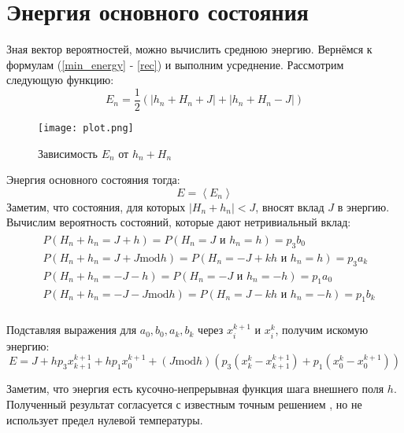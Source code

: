 \section{Энергия основного состояния}
Зная вектор вероятностей, можно вычислить среднюю энергию. Вернёмся к формулам (\ref{min_energy} - \ref{rec}) и выполним усреднение. Рассмотрим следующую функцию:
\begin{equation}
  E_n = \frac 1 2 (|h_n + H_n + J| + |h_n + H_n - J|)
\end{equation}

\begin{figure}
\centering
\texttt{[image: plot.png]}
\caption{Зависимость $E_n$ от $h_n+H_n$}
\end{figure}

Энергия основного состояния тогда:
\begin{equation}
  E = \left< E_n \right>
\end{equation}
Заметим, что состояния, для которых $|H_n + h_n| < J$, вносят вклад $J$ в энергию. Вычислим вероятность состояний, которые дают нетривиальный вклад:
\begin{align}
	\begin{split}
   &P(H_n + h_n = J+h) = P(H_n=J \text{ и } h_n = h) = p_3 b_0\\
   &P(H_n + h_n = J + J \text{mod} h) = P(H_n=-J+kh \text { и } h_n =h)=p_3 a_k\\
   &P(H_n + h_n = -J-h) = P(H_n=-J \text{ и } h_n = -h) = p_1 a_0\\
   &P(H_n + h_n =- J - J \text{mod} h) = P(H_n=J-kh \text{ и } h_n =-h)=p_1 b_k\\
   \end{split}
\end{align}

Подставляя выражения для $a_0, b_0, a_k, b_k$ через $x^{k+1}_i$ и $x^{k}_i$, получим искомую энергию:
\begin{equation}
		E = J + h p_3 x^{k+1}_{k+1}  + h p_1 x^{k+1}_0 + (J \text{mod} h) (p_3 (x^k_k - x^{k+1}_{k+1}) +p_1(x^k_0-x^{k+1}_0))
\end{equation}

Заметим, что энергия есть кусочно-непрерывная функция шага внешнего поля $h$. Полученный результат согласуется с известным точным решением \cite{nieuwenhuizen1986exactly}, но не использует предел нулевой температуры.



\newpage